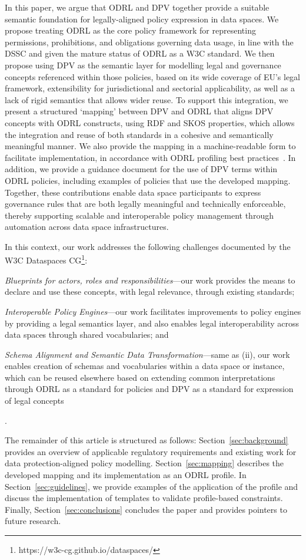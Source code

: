 In this paper,
we argue that ODRL and DPV together
provide a suitable semantic foundation
for legally-aligned policy expression in data spaces.
We propose treating ODRL as the core policy framework
for representing permissions, prohibitions, and
obligations governing data usage,
in line with the DSSC and given the mature status
of ODRL as a W3C standard.
We then propose using DPV as the semantic layer
for modelling legal and governance concepts
referenced within those policies, based on its
wide coverage of EU's legal framework, extensibility
for jurisdictional and sectorial applicability, as well
as a lack of rigid semantics that allows wider reuse.
To support this integration,
we present a structured `mapping' between DPV and ODRL
that aligns DPV concepts with ODRL constructs,
using RDF and SKOS properties,
which allows the integration and reuse of both standards
in a cohesive and semantically meaningful manner.
We also provide the mapping in a machine-readable form
to facilitate implementation,
in accordance with ODRL profiling best practices~\cite{steidl_odrl_2023}.
In addition,
we provide a guidance document for the use of
DPV terms within ODRL policies,
including examples of policies that use the developed mapping.
Together,
these contributions enable data space participants
to express governance rules that are both legally meaningful
and technically enforceable,
thereby supporting scalable and
interoperable policy management
through automation
across data space infrastructures.

In this context,
our work addresses the following challenges
documented by the W3C Dataspaces CG\footnote{https://w3c-cg.github.io/dataspaces/}:
\begin{inlinelist}
    \item[(i)] \textit{Blueprints for actors, roles and responsibilities}---our work provides the means to declare and use these concepts, with legal relevance, through existing standards;
    \item[(ii)] \textit{Interoperable Policy Engines}---our work facilitates improvements to policy engines by providing a legal semantics layer, and also enables legal interoperability across data spaces through shared vocabularies; and 
    \item[(iii)] \textit{Schema Alignment and Semantic Data Transformation}---same as (ii), our work enables creation of schemas and vocabularies within a data space or instance, which can be reused elsewhere based on extending common interpretations through ODRL as a standard for policies and DPV as a standard for expression of legal concepts
\end{inlinelist}.

The remainder of this article is structured as follows:
Section~\ref{sec:background} provides an overview of applicable regulatory requirements and existing work for data protection-aligned policy modelling.
Section~\ref{sec:mapping} describes the developed mapping and its implementation as an ODRL profile.
In Section~\ref{sec:guidelines}, we provide examples of the application of the profile and discuss the implementation of templates to validate profile-based constraints.
Finally, Section~\ref{sec:conclusions} concludes the paper and provides pointers to future research.
